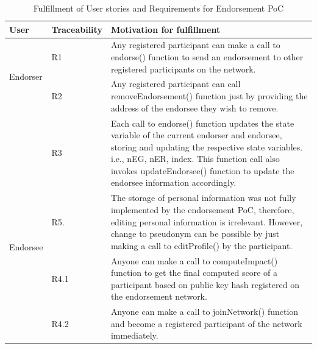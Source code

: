 \begin{center} \label{table:fulfillment} 
	\begin{table}
		\begin{tabular} {| l | l | p{9cm} | }
		\hline
		\textbf{User}  & \textbf{Traceability}   & \textbf{Motivation for fulfillment} \\
		\hline
		\multirow{2}{*}{Endorser} & R1 & Any registered participant can make a
		call to endorse() function to send an endorsement to other registered
		participants on the network.      
		\\\cline{2-3} 
		& R2  & Any registered participant can call removeEndorsement()
		function just by providing the address of the endorsee they wish to
		remove.  \\\cline{2-3}
		& R3 & Each call to endorse() function updates the state variable of
		the current endorser and endorsee, storing and updating the respective
		state variables. i.e., nEG, nER, index. This function call also invokes
		updateEndorsee() function to update the endorsee information
		accordingly.  \\\cline{2-3}
		\hline
		\multirow{2}{*}{Endorsee} & R5.& The storage of personal information
		was not fully implemented by the endorsement PoC, therefore, editing
		personal information is irrelevant. However, change to pseudonym can be
		possible by just making a call to editProfile() by the participant.
		\\\cline{2-3}
		\hline
		\multirow{2}{*}{other users} & R4.1 & Anyone can make a call to
		computeImpact() function to get the final computed score of a
		participant based on public key hash registered on the endorsement
		network. \\\cline{2-3}
		& R4.2 &  Anyone can make a call to joinNetwork() function and become a
		registered participant of the network immediately.  \\\cline{2-3}
		\hline
	\end{tabular}
	\caption{Fulfillment of User stories and Requirements for Endorsement PoC}
\end{table}
\end{center}
%
%		
\vspace{-15mm}
